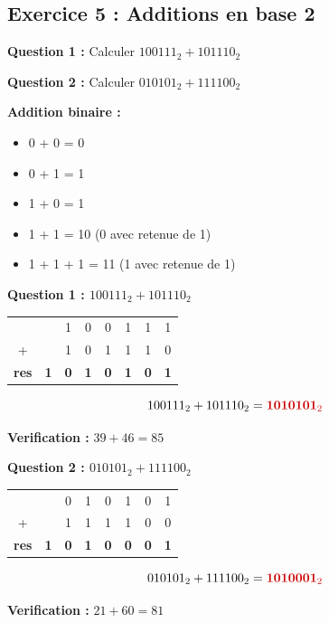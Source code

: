 \documentclass[12pt,a4paper]{article}
\begin{document}
\subsection{Exercice 5 : Additions en base 2}

\begin{exercice}
\textbf{Question 1 :} Calculer $100111_2 + 101110_2$

\textbf{Question 2 :} Calculer $010101_2 + 111100_2$
\end{exercice}

\begin{methode}
\textbf{Addition binaire :}
\begin{itemize}
    \item 0 + 0 = 0
    \item 0 + 1 = 1
    \item 1 + 0 = 1
    \item 1 + 1 = 10 (0 avec retenue de 1)
    \item 1 + 1 + 1 = 11 (1 avec retenue de 1)
\end{itemize}
\end{methode}

\begin{solution}
\textbf{Question 1 : $100111_2 + 101110_2$}

\begin{center}
\begin{tabular}{cccccccc}
  &   & 1 & 0 & 0 & 1 & 1 & 1 \\
+ &   & 1 & 0 & 1 & 1 & 1 & 0 \\
\hline
\textbf{res} & \textbf{1} & \textbf{0} & \textbf{1} & \textbf{0} & \textbf{1} & \textbf{0} & \textbf{1} \\
\end{tabular}
\end{center}

$$100111_2 + 101110_2 = \textcolor{importantrouge}{\textbf{1010101}_2}$$

\textbf{Verification :} $39 + 46 = 85$
\end{solution}

\begin{solution}
\textbf{Question 2 : $010101_2 + 111100_2$}

\begin{center}
\begin{tabular}{cccccccc}
  &   & 0 & 1 & 0 & 1 & 0 & 1 \\
+ &   & 1 & 1 & 1 & 1 & 0 & 0 \\
\hline
\textbf{res} & \textbf{1} & \textbf{0} & \textbf{1} & \textbf{0} & \textbf{0} & \textbf{0} & \textbf{1} \\
\end{tabular}
\end{center}

$$010101_2 + 111100_2 = \textcolor{importantrouge}{\textbf{1010001}_2}$$

\textbf{Verification :} $21 + 60 = 81$
\end{solution}
\end{document}
